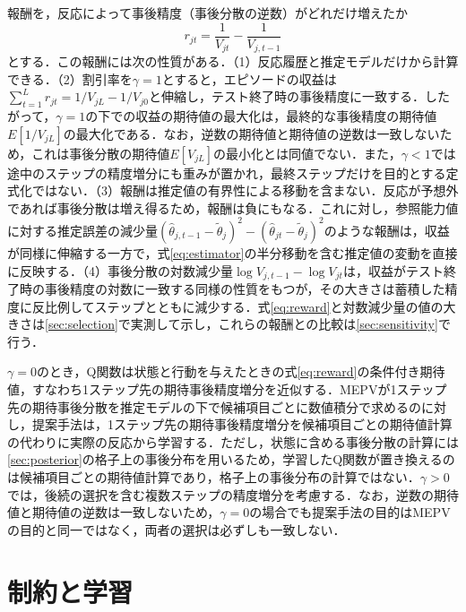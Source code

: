 \documentclass[a4paper,12pt,oneside,openany]{jsbook}
\begin{document}
報酬を，反応によって事後精度（事後分散の逆数）がどれだけ増えたか
\begin{equation}
 r_{jt}=\frac{1}{V_{jt}}-\frac{1}{V_{j,t-1}}
 \label{eq:reward}
\end{equation}
とする．この報酬には次の性質がある．（1）反応履歴と推定モデルだけから計算できる．（2）割引率を$\gamma=1$とすると，エピソードの収益は$\sum_{t=1}^{L}r_{jt}=1/V_{jL}-1/V_{j0}$と伸縮し，テスト終了時の事後精度に一致する．したがって，$\gamma=1$の下での収益の期待値の最大化は，最終的な事後精度の期待値$E[1/V_{jL}]$の最大化である．なお，逆数の期待値と期待値の逆数は一致しないため，これは事後分散の期待値$E[V_{jL}]$の最小化とは同値でない．また，$\gamma<1$では途中のステップの精度増分にも重みが置かれ，最終ステップだけを目的とする定式化ではない．（3）報酬は推定値の有界性による移動を含まない．反応が予想外であれば事後分散は増え得るため，報酬は負にもなる．これに対し，参照能力値に対する推定誤差の減少量$(\hat\theta_{j,t-1}-\tilde\theta_j)^2-(\hat\theta_{jt}-\tilde\theta_j)^2$のような報酬は，収益が同様に伸縮する一方で，式\eqref{eq:estimator}の半分移動を含む推定値の変動を直接に反映する．（4）事後分散の対数減少量$\log V_{j,t-1}-\log V_{jt}$は，収益がテスト終了時の事後精度の対数に一致する同様の性質をもつが，その大きさは蓄積した精度に反比例してステップとともに減少する．式\eqref{eq:reward}と対数減少量の値の大きさは\ref{sec:selection}で実測して示し，これらの報酬との比較は\ref{sec:sensitivity}で行う．

$\gamma=0$のとき，Q関数は状態と行動を与えたときの式\eqref{eq:reward}の条件付き期待値，すなわち1ステップ先の期待事後精度増分を近似する．MEPVが1ステップ先の期待事後分散を推定モデルの下で候補項目ごとに数値積分で求めるのに対し，提案手法は，1ステップ先の期待事後精度増分を候補項目ごとの期待値計算の代わりに実際の反応から学習する．ただし，状態に含める事後分散の計算には\ref{sec:posterior}の格子上の事後分布を用いるため，学習したQ関数が置き換えるのは候補項目ごとの期待値計算であり，格子上の事後分布の計算ではない．$\gamma>0$では，後続の選択を含む複数ステップの精度増分を考慮する．なお，逆数の期待値と期待値の逆数は一致しないため，$\gamma=0$の場合でも提案手法の目的はMEPVの目的と同一ではなく，両者の選択は必ずしも一致しない．

\section{制約と学習}\label{sec:learning}
\end{document}

